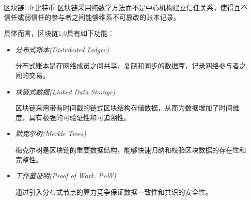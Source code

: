 \documentclass[11pt]{beamer}
\begin{document}
\begin{frame}[allowframebreaks]{区块链1.0:比特币}
	区块链采用纯数学方法而不是中心机构建立信任关系，使得互不信任或弱信任的参与者之间能够维系不可篡改的账本记录。

	具体而言，区块链1.0具有如下功能：
	\begin{itemize}
		\item \textsl{分布式账本(Distributed Ledger)} 
		
		{\footnotesize 分布式账本是在网络成员之间共享、复制和同步的数据库，记录网络参与者之间的交易。}
		
		\item \textsl{块链式数据(Linked Data Storage)} 
		
		 {\footnotesize 区块链采用带有时间戳的链式区块结构存储数据，从而为数据增加了时间维度，具有极强的可验证性和可追溯性。}
		 
		\item \textsl{默克尔树(Merkle Trees)}  
		
		{\footnotesize 梅克尔树是区块链的重要数据结构，能够快速归纳和校验区块数据的存在性和完整性。}
		
		\item \textsl{工作量证明(Proof of Work, PoW)}  
		
		{\footnotesize 通过引入分布式节点的算力竞争保证数据一致性和共识的安全性。}
	\end{itemize}
\end{frame}
\end{document}
